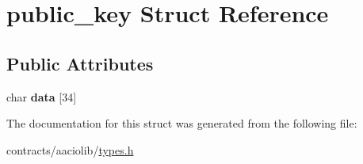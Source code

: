 \hypertarget{structpublic__key}{}\section{public\+\_\+key Struct Reference}
\label{structpublic__key}
\subsection*{Public Attributes}
\begin{DoxyCompactItemize}
\item 
\mbox{\label{structpublic__key_a29a23fbef5d278b700323146955c18e4}} 
char {\bfseries data} \mbox{[}34\mbox{]}
\end{DoxyCompactItemize}


The documentation for this struct was generated from the following file\+:\begin{DoxyCompactItemize}
\item 
contracts/aaciolib/\mbox{\hyperlink{contracts_2aaciolib_2types_8h}{types.\+h}}\end{DoxyCompactItemize}
